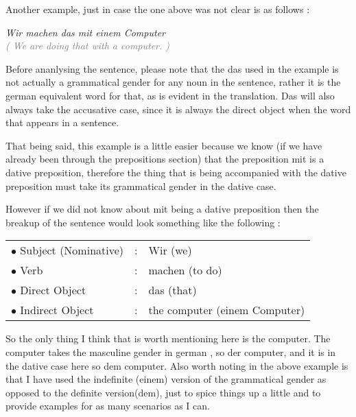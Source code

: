 \documentclass[a4paper,twocolumn,10pt]{article}
\newcommand{\bulletpoint}
{ $\bullet$  }
\newcommand{\newpar}
{\par \vspace{0.3cm}}
\begin{document}

Another example, just in case the one above was not clear is as follows :
\newpar

\noindent
\textit{Wir machen das mit einem Computer}\\
\textcolor{gray} { \textit{( We are doing that with a computer. )} } \newpar

Before ananlysing the sentence, please note that the das used in the example is
not actually a grammatical gender for any noun in the sentence, rather it is the
german equivalent word for that, as is evident in the translation. Das will also
always take the accusative case, since it is always the direct object when the
word that appears in a sentence.\newpar

That being said, this example is a little easier because we know (if we have
already been through the prepositions section) that the preposition mit is a
dative preposition, therefore the thing that is being accompanied with the
dative preposition must take its grammatical gender in the dative case.\newpar

However if we did not know about mit being a dative preposition then the breakup
of the sentence would look something like the following :\newpar


\nolinenumbers

\vspace{0.2cm}

\begin{tabularx}{0.95\linewidth}{llX}

\rowcolor{white} \bulletpoint Subject (Nominative) & : & Wir (we)   \\
\rowcolor{white} \bulletpoint Verb                 & : & machen (to do) \\
\rowcolor{white} \bulletpoint Direct Object        & : & das (that)  \\
\rowcolor{white} \bulletpoint Indirect Object      & : & the computer (einem
Computer) \\

\end{tabularx}

\vspace{0.2cm}

\linenumbers


So the only thing I think that is worth mentioning here is the computer. The
computer takes the masculine gender in german , so der computer, and it is in
the dative case here so dem computer. Also worth noting in the above example is
that I have used the indefinite (einem) version of the grammatical gender as
opposed to the definite version(dem), just to spice things up a little and to
provide examples for as many scenarios as I can.\newpar
\end{document}
